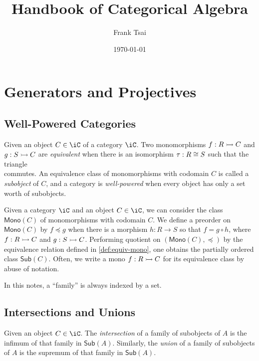 \documentclass{amsart}
\title{Handbook of Categorical Algebra}
\author{Frank Tsai}
\date{\today}
\begin{document}
\maketitle
\tableofcontents

\section{Generators and Projectives}
\label{sec:generators-and-projectives}

\subsection{Well-Powered Categories}
\label{sec:well-powered-categories}

\begin{defn}\label{def:equiv-mono}
  Given an object $C \in \iC$ of a category $\iC$.
  Two monomorphisms $f : R \rightarrowtail C$ and $g : S \rightarrowtail C$ are \emph{equivalent} when there is an isomorphism $\tau : R \cong S$ such that the triangle
  \[\]
  commutes.
  An equivalence class of monomorphisms with codomain $C$ is called a \emph{subobject} of $C$, and a category is \emph{well-powered} when every object has only a set worth of subobjects.
\end{defn}

Given a category $\iC$ and an object $C \in \iC$, we can consider the class $\mathsf{Mono}(C)$ of monomorphisms with codomain $C$.
We define a preorder on $\mathsf{Mono}(C)$ by $f \preceq g$ when there is a morphism $h : R \to S$ so that $f = g \circ h$, where $f : R \rightarrowtail C$ and $g : S \rightarrowtail C$.
Performing quotient on $(\mathsf{Mono}(C),\preceq)$ by the equivalence relation defined in \cref{def:equiv-mono}, one obtains the partially ordered class $\mathsf{Sub}(C)$.
Often, we write a mono $f : R \rightarrowtail C$ for its equivalence class by abuse of notation.

In this notes, a ``family'' is always indexed by a set.

\subsection{Intersections and Unions}
\label{sec:intersections-and-unions}

\begin{defn}
  Given an object $C \in \iC$.
  The \emph{intersection} of a family of subobjects of $A$ is the infimum of that family in $\mathsf{Sub}(A)$.
  Similarly, the \emph{union} of a family of subobjects of $A$ is the supremum of that family in $\mathsf{Sub}(A)$.
\end{defn}
\end{document}
